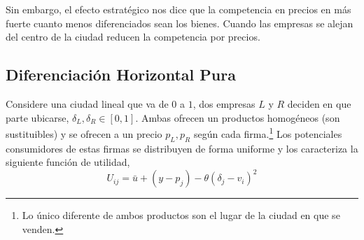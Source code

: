 \documentclass{exam}
\begin{document}
\begin{itemize}
\begin{solution}
        Sin embargo, el efecto estratégico nos dice que la competencia en precios en más fuerte cuanto menos diferenciados sean los bienes. Cuando las empresas se alejan del centro de la ciudad reducen la competencia por precios. 
    \end{solution}
\end{itemize}




\subsection{Diferenciación Horizontal Pura}
Considere una ciudad lineal que va de $0$ a $1$, dos empresas $L$ y $R$ deciden en que parte ubicarse, $\delta _L,\delta_R \in [0,1]$. Ambas ofrecen un productos homogéneos (son sustituibles) y se ofrecen a un precio $p_L, p_R$ según cada firma.\footnote{Lo único diferente de ambos productos son el lugar de la ciudad en que se venden.} Los potenciales consumidores de estas firmas se distribuyen de forma uniforme y los caracteriza la siguiente función de utilidad,
\begin{equation*}
    U_{ij} = \bar{u} + (y-p_j) - \theta (\delta_j - v_i)^2 \label{función utilidad}
\end{equation*}
\end{document}
